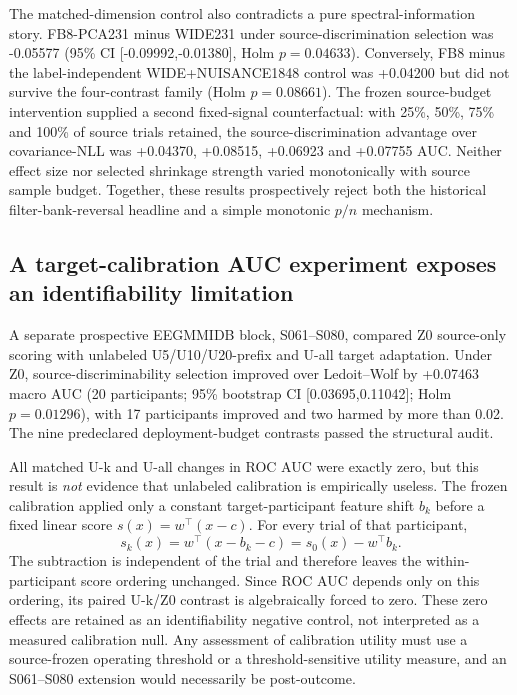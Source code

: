 The matched-dimension control also contradicts a pure spectral-information
story. FB8-\allowbreak PCA231 minus WIDE231 under source-discrimination selection was
-0.05577 (95\% CI [-0.09992,-0.01380], Holm \(p=0.04633\)).
Conversely, FB8 minus the label-independent WIDE+\allowbreak NUISANCE1848 control was
+0.04200 but did not survive the four-contrast family (Holm
\(p=0.08661\)). The frozen source-budget intervention supplied a second
fixed-signal counterfactual: with 25\%, 50\%, 75\% and 100\% of source
trials retained, the source-discrimination advantage over covariance-NLL was
+0.04370, +0.08515, +0.06923 and +0.07755 AUC. Neither effect size nor
selected shrinkage strength varied monotonically with source sample budget.
Together, these results prospectively reject both the historical
filter-bank-reversal headline and a simple monotonic \(p/n\) mechanism.

\subsection{A target-calibration AUC experiment exposes an identifiability limitation}
A separate prospective EEGMMIDB block, S061--S080, compared Z0
source-only scoring with unlabeled U5/U10/U20-prefix and U-all target
adaptation. Under Z0, source-discriminability selection improved over
Ledoit--Wolf by +0.07463 macro AUC (20 participants; 95\% bootstrap CI
[0.03695,0.11042]; Holm \(p=0.01296\)), with 17 participants improved
and two harmed by more than 0.02. The nine predeclared deployment-budget
contrasts passed the structural audit.

All matched U-k and U-all changes in ROC AUC were exactly zero, but this
result is \emph{not} evidence that unlabeled calibration is empirically
useless. The frozen calibration applied only a constant target-participant
feature shift \(b_k\) before a fixed linear score \(s(x)=w^\top(x-c)\).
For every trial of that participant,
\[
s_k(x)=w^\top(x-b_k-c)=s_0(x)-w^\top b_k.
\]
The subtraction is independent of the trial and therefore leaves the
within-participant score ordering unchanged. Since ROC AUC depends
only on this ordering, its paired U-k/Z0 contrast is algebraically forced
to zero. These zero effects are retained as an identifiability negative
control, not interpreted as a measured calibration null. Any assessment of
calibration utility must use a source-frozen operating threshold or a
threshold-sensitive utility measure, and an S061--S080 extension would
necessarily be post-outcome.


